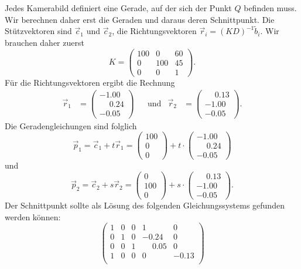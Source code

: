 \begin{loesung}
Jedes Kamerabild definiert eine Gerade, auf der sich der Punkt $Q$ 
befinden muss.
Wir berechnen daher erst die Geraden und daraus deren Schnittpunkt.
Die Stützvektoren sind $\vec c_1$ und $\vec c_2$, die Richtungsvektoren
$\vec r_i = (KD)^{-1}\tilde b_i$.
Wir brauchen daher zuerst 
\[
K
=
\begin{pmatrix}
100&  0&60\\
  0&100&45\\
  0&  0& 1
\end{pmatrix}.
\]
Für die Richtungsvektoren ergibt die Rechnung
\[
\begin{aligned}
\vec r_1
&=
\begin{pmatrix}
  -1.00\\
   \phantom{-}0.24\\
  -0.05
\end{pmatrix}
&
&\text{und}
&
\vec r_2
&=
\begin{pmatrix}
   \phantom{-}0.13\\
  -1.00\\
  -0.05
\end{pmatrix}.
\end{aligned}
\]
Die Geradengleichungen sind folglich
\[
 \vec p_1 = \vec c_1+t \vec r_1 = 
\begin{pmatrix}
  100\\
   0\\
  0
\end{pmatrix}
+t\cdot
\begin{pmatrix}
  -1.00\\
   \phantom{-}0.24\\
  -0.05
\end{pmatrix}
\]
und
\[
 \vec p_2 = \vec c_2+s \vec r_2 = 
\begin{pmatrix}
   0\\
  100\\
  0
\end{pmatrix}
+s\cdot
\begin{pmatrix}
   \phantom{-}0.13\\
  -1.00\\
  -0.05
\end{pmatrix}.
\]
Der Schnittpunkt sollte als Lösung des folgenden 
Gleichungssystems gefunden werden können:
\[
\begin{pmatrix}
1&0&0& 1 & 0 \\
0&1&0&-0.24 & 0 \\
0&0&1& \phantom{-}0.05 & 0\\
1&0&0& 0 & -0.13\\

\end{pmatrix}\]
\end{loesung}
